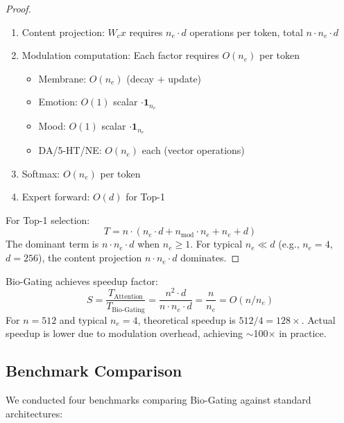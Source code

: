 \documentclass[preprint,12pt]{elsarticle}
\begin{document}
\begin{proof}
\begin{enumerate}
\item Content projection: $W_c x$ requires $n_e \cdot d$ operations per token, total $n \cdot n_e \cdot d$
\item Modulation computation: Each factor requires $O(n_e)$ per token
\begin{itemize}
\item Membrane: $O(n_e)$ (decay + update)
\item Emotion: $O(1)$ scalar $\cdot \mathbf{1}_{n_e}$
\item Mood: $O(1)$ scalar $\cdot \mathbf{1}_{n_e}$
\item DA/5-HT/NE: $O(n_e)$ each (vector operations)
\end{itemize}
\item Softmax: $O(n_e)$ per token
\item Expert forward: $O(d)$ for Top-1
\end{enumerate}
For Top-1 selection:
\begin{equation}
T = n \cdot (n_e \cdot d + n_{\text{mod}} \cdot n_e + n_e + d)
\end{equation}
The dominant term is $n \cdot n_e \cdot d$ when $n_e \geq 1$. For typical $n_e \ll d$ (e.g., $n_e = 4$, $d = 256$), the content projection $n \cdot n_e \cdot d$ dominates.
\end{proof}

\begin{corollary}
Bio-Gating achieves speedup factor:
\begin{equation}
S = \frac{T_{\text{Attention}}}{T_{\text{Bio-Gating}}} = \frac{n^2 \cdot d}{n \cdot n_e \cdot d} = \frac{n}{n_e} = O(n/n_e)
\end{equation}
For $n = 512$ and typical $n_e = 4$, theoretical speedup is $512/4 = 128\times$. Actual speedup is lower due to modulation overhead, achieving $\sim$100$\times$ in practice.
\end{corollary}

\subsection{Benchmark Comparison}

We conducted four benchmarks comparing Bio-Gating against standard architectures:
\end{document}
